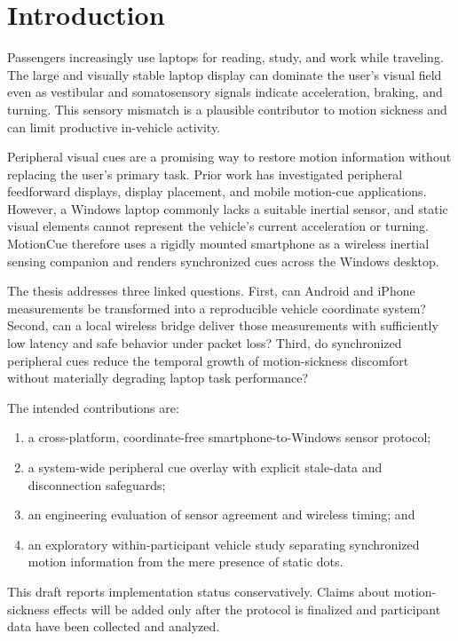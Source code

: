 \section{Introduction}
\label{sec:introduction}

Passengers increasingly use laptops for reading, study, and work while traveling. The large and visually stable laptop display can dominate the user's visual field even as vestibular and somatosensory signals indicate acceleration, braking, and turning. This sensory mismatch is a plausible contributor to motion sickness and can limit productive in-vehicle activity.

Peripheral visual cues are a promising way to restore motion information without replacing the user's primary task. Prior work has investigated peripheral feedforward displays, display placement, and mobile motion-cue applications. However, a Windows laptop commonly lacks a suitable inertial sensor, and static visual elements cannot represent the vehicle's current acceleration or turning. MotionCue therefore uses a rigidly mounted smartphone as a wireless inertial sensing companion and renders synchronized cues across the Windows desktop.

The thesis addresses three linked questions. First, can Android and iPhone measurements be transformed into a reproducible vehicle coordinate system? Second, can a local wireless bridge deliver those measurements with sufficiently low latency and safe behavior under packet loss? Third, do synchronized peripheral cues reduce the temporal growth of motion-sickness discomfort without materially degrading laptop task performance?

The intended contributions are:
\begin{enumerate}
    \item a cross-platform, coordinate-free smartphone-to-Windows sensor protocol;
    \item a system-wide peripheral cue overlay with explicit stale-data and disconnection safeguards;
    \item an engineering evaluation of sensor agreement and wireless timing; and
    \item an exploratory within-participant vehicle study separating synchronized motion information from the mere presence of static dots.
\end{enumerate}

This draft reports implementation status conservatively. Claims about motion-sickness effects will be added only after the protocol is finalized and participant data have been collected and analyzed.
